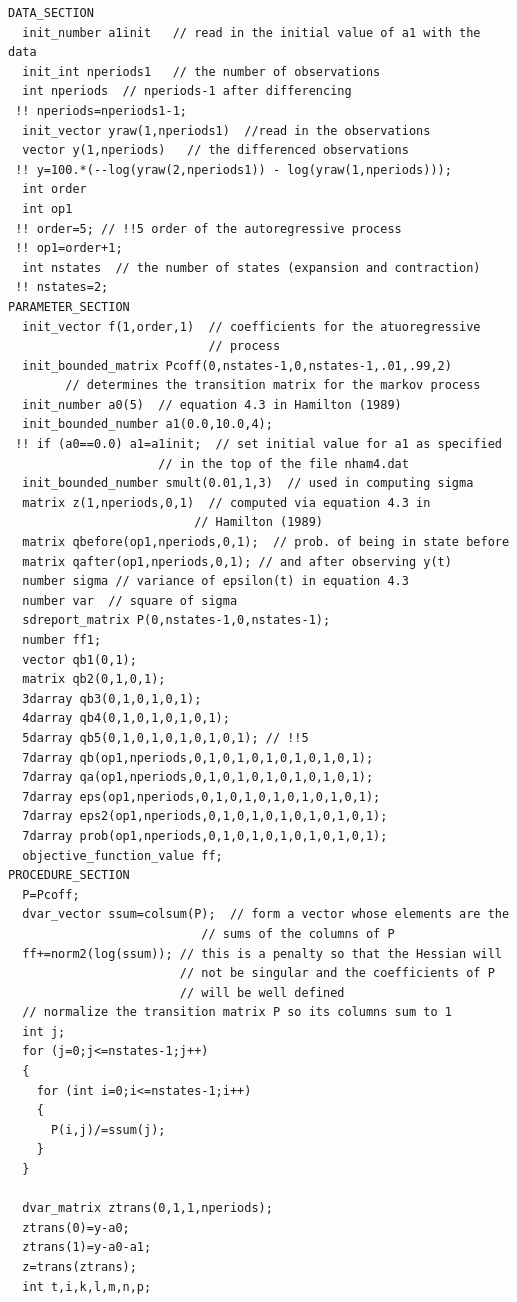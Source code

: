 \documentclass{admbmanual}
\begin{document}
\begin{lstlisting}
DATA_SECTION
  init_number a1init   // read in the initial value of a1 with the data
  init_int nperiods1   // the number of observations
  int nperiods  // nperiods-1 after differencing
 !! nperiods=nperiods1-1;
  init_vector yraw(1,nperiods1)  //read in the observations
  vector y(1,nperiods)   // the differenced observations
 !! y=100.*(--log(yraw(2,nperiods1)) - log(yraw(1,nperiods))); 
  int order 
  int op1  
 !! order=5; // !!5 order of the autoregressive process
 !! op1=order+1;
  int nstates  // the number of states (expansion and contraction)
 !! nstates=2;
PARAMETER_SECTION
  init_vector f(1,order,1)  // coefficients for the atuoregressive
                            // process
  init_bounded_matrix Pcoff(0,nstates-1,0,nstates-1,.01,.99,2)  
        // determines the transition matrix for the markov process
  init_number a0(5)  // equation 4.3 in Hamilton (1989)
  init_bounded_number a1(0.0,10.0,4);  
 !! if (a0==0.0) a1=a1init;  // set initial value for a1 as specified
                     // in the top of the file nham4.dat
  init_bounded_number smult(0.01,1,3)  // used in computing sigma
  matrix z(1,nperiods,0,1)  // computed via equation 4.3 in 
                          // Hamilton (1989)
  matrix qbefore(op1,nperiods,0,1);  // prob. of being in state before
  matrix qafter(op1,nperiods,0,1); // and after observing y(t)
  number sigma // variance of epsilon(t) in equation 4.3
  number var  // square of sigma
  sdreport_matrix P(0,nstates-1,0,nstates-1);
  number ff1;
  vector qb1(0,1); 
  matrix qb2(0,1,0,1); 
  3darray qb3(0,1,0,1,0,1);
  4darray qb4(0,1,0,1,0,1,0,1);
  5darray qb5(0,1,0,1,0,1,0,1,0,1); // !!5
  7darray qb(op1,nperiods,0,1,0,1,0,1,0,1,0,1,0,1); 
  7darray qa(op1,nperiods,0,1,0,1,0,1,0,1,0,1,0,1);
  7darray eps(op1,nperiods,0,1,0,1,0,1,0,1,0,1,0,1);
  7darray eps2(op1,nperiods,0,1,0,1,0,1,0,1,0,1,0,1);
  7darray prob(op1,nperiods,0,1,0,1,0,1,0,1,0,1,0,1);
  objective_function_value ff;
PROCEDURE_SECTION
  P=Pcoff;
  dvar_vector ssum=colsum(P);  // form a vector whose elements are the
                           // sums of the columns of P
  ff+=norm2(log(ssum)); // this is a penalty so that the Hessian will
                        // not be singular and the coefficients of P 
                        // will be well defined
  // normalize the transition matrix P so its columns sum to 1
  int j;
  for (j=0;j<=nstates-1;j++)
  {
    for (int i=0;i<=nstates-1;i++)
    {
      P(i,j)/=ssum(j);
    }
  }  

  dvar_matrix ztrans(0,1,1,nperiods);
  ztrans(0)=y-a0;
  ztrans(1)=y-a0-a1;
  z=trans(ztrans);
  int t,i,k,l,m,n,p;
  

\end{lstlisting}
\end{document}
